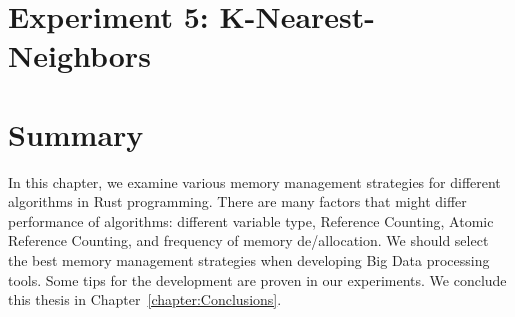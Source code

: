 \section{Experiment 5: K-Nearest-Neighbors}
\label{sec:eval_knn}


\section{Summary}
\label{sec:eval_summary}
In this chapter, we examine various memory management strategies for different algorithms in Rust programming.
There are many factors that might differ performance of algorithms: different variable type, Reference Counting, Atomic Reference Counting, and frequency of memory de/allocation.
We should select the best memory management strategies when developing Big Data processing tools. 
Some tips for the development are proven in our experiments. We conclude this thesis in Chapter~\ref{chapter:Conclusions}.

% 